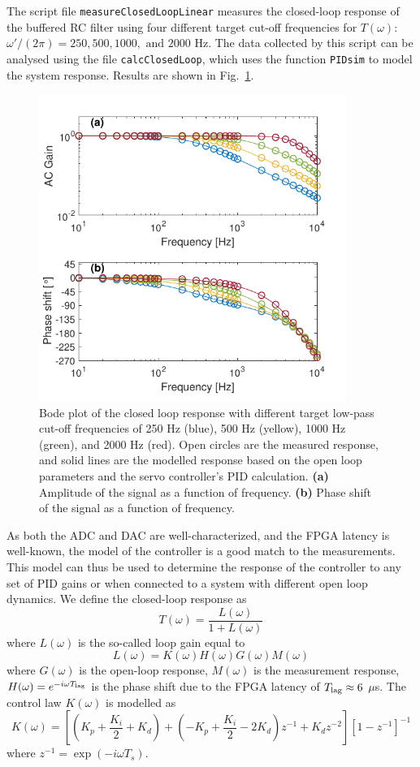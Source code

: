 \documentclass{article}
\begin{document}
The script file \verb|measureClosedLoopLinear| measures the closed-loop response of the buffered RC filter using four different target cut-off frequencies for $T(\omega)$: $\omega'/(2\pi) = 250,500,1000,\text{ and }2000$ Hz.  The data collected by this script can be analysed using the file \verb|calcClosedLoop|, which uses the function \verb|PIDsim| to model the system response.  Results are shown in Fig.~\ref{fg:closedLoopResponse}.
\begin{figure}[htbp]
	\centering
	\includegraphics[width=10cm]{ClosedLoop.pdf}
	\caption{Bode plot of the closed loop response with different target low-pass cut-off frequencies of 250 Hz (blue), 500 Hz (yellow), 1000 Hz (green), and 2000 Hz (red).  Open circles are the measured response, and solid lines are the modelled response based on the open loop parameters and the servo controller's PID calculation.  \textbf{(a)} Amplitude of the signal as a function of frequency.  \textbf{(b)} Phase shift of the signal as a function of frequency.}
	\label{fg:closedLoopResponse}
\end{figure}
As both the ADC and DAC are well-characterized, and the FPGA latency is well-known, the model of the controller is a good match to the measurements.  This model can thus be used to determine the response of the controller to any set of PID gains or when connected to a system with different open loop dynamics.  We define the closed-loop response as
\[
T(\omega) = \frac{L(\omega)}{1+L(\omega)}
\]
where $L(\omega)$ is the so-called loop gain equal to
\[
L(\omega) = K(\omega)H(\omega)G(\omega)M(\omega)
\]
where $G(\omega)$ is the open-loop response, $M(\omega)$ is the measurement response, $H(\omega) = e^{-i\omega T_{\rm lag}}$ is the phase shift due to the FPGA latency of $T_{\rm lag} \approx 6$ $\mu$s.  The control law $K(\omega)$ is modelled as
\begin{equation}
K(\omega) = \left[\left(K_p+\frac{K_i}{2}+K_d\right) + \left(-K_p+\frac{K_i}{2}-2K_d\right)z^{-1} + K_dz^{-2}\right]\left[1-z^{-1}\right]^{-1}
\label{eq:discreteControlLaw}
\end{equation}
where $z^{-1} = \exp\left(-i\omega T_s\right)$.
\end{document}
